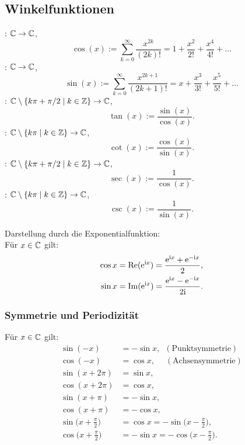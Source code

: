 \subsection{Winkelfunktionen}
\begin{Definition}
: $\mathbb C\to\mathbb C$,
\begin{equation}
\cos(x) := \sum_{k=0}^\infty \frac{x^{2k}}{(2k)!}
= 1+\frac{x^2}{2!}+\frac{x^4}{4!}+\ldots
\end{equation}
: $\mathbb C\to\mathbb C$,
\begin{equation}
\sin(x) := \sum_{k=0}^\infty \frac{x^{2k+1}}{(2k+1)!}
= x+\frac{x^3}{3!}+\frac{x^5}{5!}+\ldots
\end{equation}
: $\mathbb C\setminus\{k\pi+\pi/2\mid k\in\mathbb Z\}\to\mathbb C$,
\begin{equation}
\tan(x) := \frac{\sin(x)}{\cos(x)}.
\end{equation}
: $\mathbb C\setminus\{k\pi\mid k\in\mathbb Z\}\to\mathbb C$,
\begin{equation}
\cot(x) := \frac{\cos(x)}{\sin(x)}.
\end{equation}
: $\mathbb C\setminus\{k\pi+\pi/2\mid k\in\mathbb Z\}\to\mathbb C$,
\begin{equation}
\sec(x) := \frac{1}{\cos(x)}.
\end{equation}
: $\mathbb C\setminus\{k\pi\mid k\in\mathbb Z\}\to\mathbb C$,
\begin{equation}
\csc(x) := \frac{1}{\sin(x)}.
\end{equation}
\end{Definition}
\noindent
Darstellung durch die Exponentialfunktion:\\
Für $x\in\mathbb C$ gilt:
\begin{align}
\cos x &= \operatorname{Re}(\mathrm e^{\mathrm i x}) = \frac{\mathrm e^{\mathrm i x}+\mathrm e^{-\mathrm i x}}{2},\\
\sin x &= \operatorname{Im}(\mathrm e^{\mathrm i x}) = \frac{\mathrm e^{\mathrm i x}-\mathrm e^{-\mathrm i x}}{2\mathrm i}.
\end{align}

\subsubsection{Symmetrie und Periodizität}
Für $x\in\mathbb C$ gilt:
\begin{align}
\sin(-x) &= -\sin x,\enspace(\text{Punktsymmetrie})\\
\cos(-x) &= \cos x,\quad\;(\text{Achsensymmetrie})\\
\sin(x+2\pi) &= \sin x,\\
\cos(x+2\pi) &= \cos x,\\
\sin(x+\pi)  &=-\sin x,\\
\cos(x+\pi)  &=-\cos x,\\
\sin\Big(x+\frac{\pi}{2}\Big) &= \cos x = -\sin\Big(x-\frac{\pi}{2}\Big),\\
\cos\Big(x+\frac{\pi}{2}\Big) &= -\sin x = -\cos\Big(x-\frac{\pi}{2}\Big).
\end{align}


